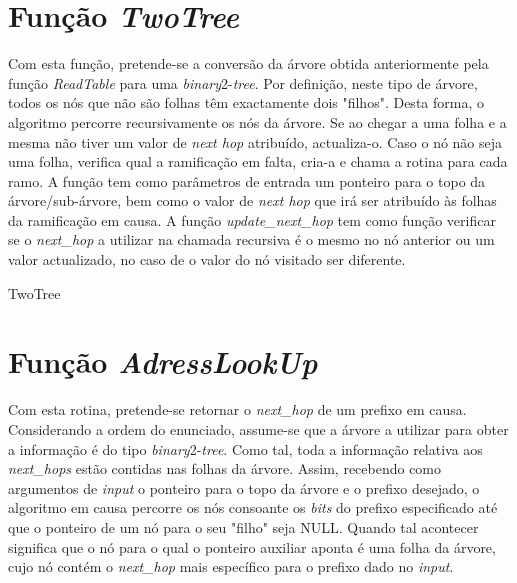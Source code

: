 \documentclass[a4paper]{article}
\begin{document}
\section{Função \textit{TwoTree}}
Com esta função, pretende-se a conversão da árvore obtida anteriormente pela função \textit{ReadTable} para uma \textit{binary}2-\textit{tree}. Por definição, neste tipo de árvore, todos os nós que não são folhas têm exactamente dois "filhos". Desta forma, o algoritmo percorre recursivamente os nós da árvore. Se ao chegar a uma folha e a mesma não tiver um valor de \textit{next hop} atribuído, actualiza-o. Caso o nó não seja uma folha, verifica qual a ramificação em falta, cria-a e chama a rotina para cada ramo. A função tem como parâmetros de entrada um ponteiro para o topo da árvore/sub-árvore, bem como o valor de \textit{next hop} que irá ser atribuído às folhas da ramificação em  causa. A função \textit{update\_next\_hop} tem como função verificar se o \textit{next\_hop} a utilizar na chamada recursiva é o mesmo no nó anterior ou um valor actualizado, no caso de o valor do nó visitado ser diferente.

\begin{algorithm}[H]
 \Return\;
 \caption{TwoTree}
\end{algorithm}

\section{Função \textit{AdressLookUp}}
Com esta rotina, pretende-se retornar o \textit{next\_hop} de um prefixo em causa. Considerando a ordem do enunciado, assume-se que a árvore a utilizar para obter a informação é do tipo \textit{binary}2-\textit{tree}. Como tal, toda a informação relativa aos \textit{next\_hops} estão contidas nas folhas da árvore. Assim, recebendo como argumentos de \textit{input} o ponteiro para o topo da árvore e o prefixo desejado, o algoritmo em causa percorre os nós consoante os \textit{bits} do prefixo especificado até que o ponteiro de um nó para o seu "filho" seja NULL. Quando tal acontecer significa que o nó para o qual o ponteiro auxiliar aponta é uma folha da árvore, cujo nó contém o \textit{next\_hop} mais específico para o prefixo dado no \textit{input}.
\end{document}
